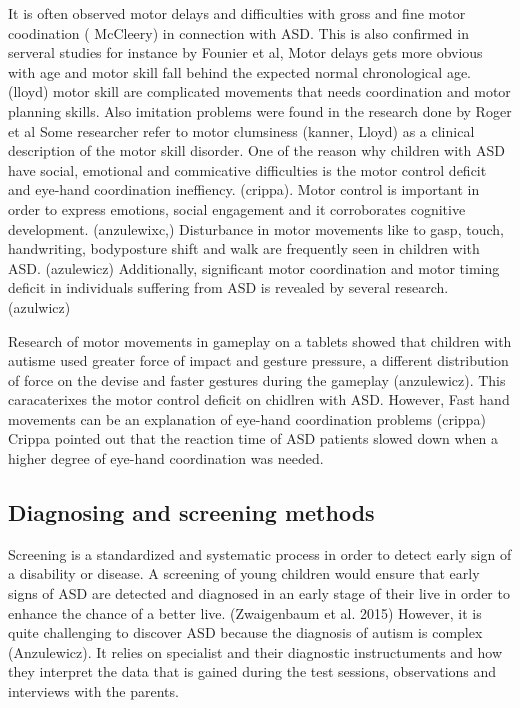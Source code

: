 It is often observed motor delays and difficulties with gross and fine motor coodination ( McCleery) in connection with ASD.  This is also confirmed in serveral studies for instance by Founier et al, Motor delays gets more obvious with age and motor skill fall behind the expected normal chronological age. (lloyd) motor skill are complicated movements that needs coordination and motor planning skills. 
Also imitation problems were found in the research done by  Roger et al
Some researcher refer to motor clumsiness (kanner, Lloyd) as a clinical description of the motor skill disorder.
One of the reason why children with ASD have social, emotional and commicative difficulties is the motor control deficit and eye-hand coordination ineffiency. (crippa). Motor control is important in order to express emotions, social engagement and it corroborates cognitive development. (anzulewixc,) 
Disturbance in motor movements like to gasp, touch, handwriting, bodyposture shift and walk are frequently seen in children with ASD. (azulewicz) Additionally, significant motor coordination and motor timing deficit in individuals suffering from ASD is revealed by several research. (azulwicz)

Research of motor movements in gameplay on a tablets showed that children with autisme used greater force of impact and gesture pressure, a different distribution of force on the devise and faster gestures during the gameplay (anzulewicz). This caracaterixes the motor control deficit on chidlren with ASD. However,  Fast hand movements can be an explanation of eye-hand coordination problems (crippa) Crippa pointed out that the reaction time of ASD patients slowed down  when a higher degree of eye-hand coordination was needed.




\subsection{Diagnosing and screening methods}

Screening is a standardized and systematic process in order to detect early sign of a disability or disease. A screening of young children would ensure that early signs of ASD are detected and diagnosed in an early stage of their live in order to enhance the chance of a better live. (Zwaigenbaum et al. 2015)  
However, it is quite challenging to discover ASD because the diagnosis of autism is complex (Anzulewicz). It relies on specialist and their diagnostic instructuments and how they interpret the data that is gained during the test sessions, observations and interviews with the parents.


